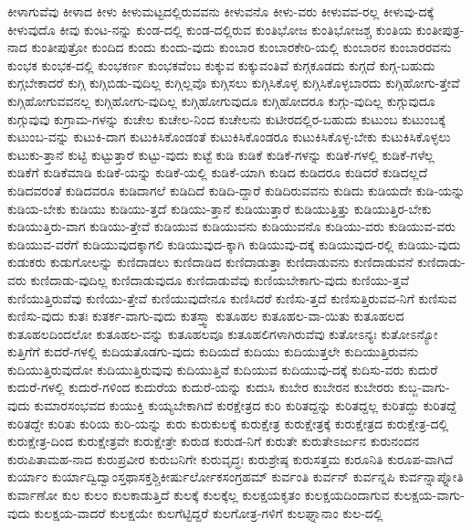 {ಕೀಳಾಗುವೆವು
ಕೀಳಾದ
ಕೀಳು
ಕೀಳುಮಟ್ಟದಲ್ಲಿರುವವನು
ಕೀಳುವನೊ
ಕೀಳು-ವರು
ಕೀಳುವವ-ರಲ್ಲ
ಕೀಳುವು-ದಕ್ಕೆ
ಕೀಳುವುದೊ
ಕೀವು
ಕುಂಟ-ನನ್ನು
ಕುಂಡ-ದಲ್ಲಿ
ಕುಂಡ-ದಲ್ಲಿರುವ
ಕುಂತಿಭೋಜ
ಕುಂತಿಭೋಜಶ್ಚ
ಕುಂತಿಯ
ಕುಂತೀಪುತ್ರ-ನಾದ
ಕುಂತೀಪುತ್ರೋ
ಕುಂದಿದ
ಕುಂದು
ಕುಂದು-ವುದು
ಕುಂಬಾರ
ಕುಂಬಾರಕೇರಿ-ಯಲ್ಲಿ
ಕುಂಬಾರನ
ಕುಂಬಾರರವನು
ಕುಂಭಕ
ಕುಂಭಕ-ದಲ್ಲಿ
ಕುಂಭಕರ್ಣ
ಕುಂಭಕವೆಂಬ
ಕುಕ್ಕುವ
ಕುಕ್ಕುವಂತಿವೆ
ಕುಗ್ಗಕೂಡದು
ಕುಗ್ಗದೆ
ಕುಗ್ಗ-ಬಹುದು
ಕುಗ್ಗಬೇಕಾದರೆ
ಕುಗ್ಗಿ
ಕುಗ್ಗಿಬಿಡು-ವುದಿಲ್ಲ
ಕುಗ್ಗಿಲ್ಲವೊ
ಕುಗ್ಗಿಸಲು
ಕುಗ್ಗಿಸಿಕೊಳ್ಳ
ಕುಗ್ಗಿಸಿಕೊಳ್ಳಬಾರದು
ಕುಗ್ಗಿಹೋಗು-ತ್ತೇವೆ
ಕುಗ್ಗಿಹೋಗುವವನಲ್ಲ
ಕುಗ್ಗಿಹೋಗು-ವುದಿಲ್ಲ
ಕುಗ್ಗಿಹೋಗುವುದೂ
ಕುಗ್ಗಿಹೋದರೂ
ಕುಗ್ಗು-ವುದಿಲ್ಲ
ಕುಗ್ಗುವುದೂ
ಕುಗ್ಗುವುವು
ಕುಗ್ರಾಮ-ಗಳನ್ನು
ಕುಚೇಲ
ಕುಚೇಲ-ನಿಂದ
ಕುಚೇಲನು
ಕುಟೀರದಲ್ಲಿರ-ಬಹುದು
ಕುಟುಂಬ
ಕುಟುಂಬಕ್ಕೆ
ಕುಟುಂಬ-ವನ್ನು
ಕುಟುಕಿ-ದಾಗ
ಕುಟುಕಿಸಿಕೊಂಡಂತೆ
ಕುಟುಕಿಸಿಕೊಂಡರೂ
ಕುಟುಕಿಸಿಕೊಳ್ಳ-ಬೇಕು
ಕುಟುಕಿಸಿಕೊಳ್ಳಲು
ಕುಟುಕು-ತ್ತಾನೆ
ಕುಟ್ಟಿ
ಕುಟ್ಟುತ್ತಾರೆ
ಕುಟ್ಟು-ವುದು
ಕುಟ್ಟೆ
ಕುಡಿ
ಕುಡಿಕೆ
ಕುಡಿಕೆ-ಗಳನ್ನು
ಕುಡಿಕೆ-ಗಳಲ್ಲಿ
ಕುಡಿಕೆ-ಗಳೆಲ್ಲ
ಕುಡಿಕೆಗೆ
ಕುಡಿಕೆಮಾಡಿ
ಕುಡಿಕೆ-ಯನ್ನು
ಕುಡಿಕೆ-ಯಲ್ಲಿ
ಕುಡಿಕೆ-ಯಾಗಿ
ಕುಡಿದ
ಕುಡಿದರೂ
ಕುಡಿದರೆ
ಕುಡಿದಲ್ಲದೆ
ಕುಡಿದವರಂತೆ
ಕುಡಿದವರೂ
ಕುಡಿದಾಗಲೆ
ಕುಡಿದಿದೆ
ಕುಡಿದಿ-ದ್ದಾರೆ
ಕುಡಿದಿರುವವನು
ಕುಡಿದು
ಕುಡಿಯದೇ
ಕುಡಿ-ಯನ್ನು
ಕುಡಿಯ-ಬೇಕು
ಕುಡಿಯು
ಕುಡಿಯು-ತ್ತದೆ
ಕುಡಿಯು-ತ್ತಾನೆ
ಕುಡಿಯುತ್ತಾರೆ
ಕುಡಿಯುತ್ತಿತ್ತು
ಕುಡಿಯುತ್ತಿರ-ಬೇಕು
ಕುಡಿಯುತ್ತಿರು-ವಾಗ
ಕುಡಿಯು-ತ್ತೇವೆ
ಕುಡಿಯುವ
ಕುಡಿಯುವನು
ಕುಡಿಯುವನೊ
ಕುಡಿಯು-ವರು
ಕುಡಿಯುವ-ವರು
ಕುಡಿಯುವ-ವರೆಗೆ
ಕುಡಿಯುವುದಕ್ಕಾಗಲಿ
ಕುಡಿಯುವುದ-ಕ್ಕಾಗಿ
ಕುಡಿಯುವು-ದಕ್ಕೆ
ಕುಡಿಯುವುದ-ರಲ್ಲಿ
ಕುಡಿಯು-ವುದು
ಕುಡುಕರು
ಕುಡುಗೋಲನ್ನು
ಕುಣಿದಾಡಲು
ಕುಣಿದಾಡಿದ
ಕುಣಿದಾಡುತ್ತಾ
ಕುಣಿದಾಡುವನು
ಕುಣಿದಾಡುವನೆ
ಕುಣಿದಾಡು-ವರು
ಕುಣಿದಾಡು-ವುದಿಲ್ಲ
ಕುಣಿದಾಡುವುದೂ
ಕುಣಿದಾಡುವೆವು
ಕುಣಿಯಬೇಕಾಗು-ವುದು
ಕುಣಿಯು-ತ್ತವೆ
ಕುಣಿಯುತ್ತಿರುವೆವು
ಕುಣಿಯು-ತ್ತೇವೆ
ಕುಣಿಯುವುದೇನೂ
ಕುಣಿಸಿದರೆ
ಕುಣಿಸು-ತ್ತದೆ
ಕುಣಿಸುತ್ತಿರುವವ-ನಿಗೆ
ಕುಣಿಸುವ
ಕುಣಿಸು-ವುದು
ಕುತಃ
ಕುತರ್ಕ-ವಾಗು-ವುದು
ಕುತಸ್ತ್ವಾ
ಕುತೂಹಲ
ಕುತೂಹಲ-ವಾ-ಯಿತು
ಕುತೂಹಲದ
ಕುತೂಹಲದಿಂದಲೋ
ಕುತೂಹಲ-ವನ್ನು
ಕುತೂಹಲವೂ
ಕುತೂಹಲಿಗಳಾಗಿರುವೆವು
ಕುತೋಽನ್ಯಃ
ಕುತೋಽನ್ಯೋ
ಕುತ್ತಿಗೆಗೆ
ಕುದರೆ-ಗಳಲ್ಲಿ
ಕುದಿಯತೊಡಗು-ವುದು
ಕುದಿಯದೆ
ಕುದಿಯು
ಕುದಿಯುತ್ತಲೇ
ಕುದಿಯುತ್ತಿರುವನು
ಕುದಿಯುತ್ತಿರುವುದೋ
ಕುದಿಯುತ್ತಿರುವುವು
ಕುದಿಯುತ್ತಿವೆ
ಕುದಿಯುವ
ಕುದಿಯುವು-ದಕ್ಕೆ
ಕುದಿಸು-ವರು
ಕುದುರೆ
ಕುದುರೆ-ಗಳಲ್ಲಿ
ಕುದುರೆ-ಗಳಿಂದ
ಕುದುರೆಯ
ಕುದುರೆ-ಯನ್ನು
ಕುದುಸಿ
ಕುಬೇರ
ಕುಬೇರನ
ಕುಬೇರರು
ಕುಬ್ಜ-ವಾಗು-ವುದು
ಕುಮಾರಸಂಭವದ
ಕುಯುಕ್ತಿ
ಕುಯ್ಯಬೇಕಾಗಿದೆ
ಕುರಕ್ಷೇತ್ರದ
ಕುರಿ
ಕುರಿತದ್ದನ್ನು
ಕುರಿತದ್ದಲ್ಲ
ಕುರಿತದ್ದು
ಕುರಿತದ್ದೆ
ಕುರಿತದ್ದೇ
ಕುರಿತು
ಕುರಿಯ
ಕುರಿ-ಯನ್ನು
ಕುರು
ಕುರುಕುಲಕ್ಕೆ
ಕುರುಕ್ಷೇತ್ರ
ಕುರುಕ್ಷೇತ್ರಕ್ಕೆ
ಕುರುಕ್ಷೇತ್ರದ
ಕುರುಕ್ಷೇತ್ರ-ದಲ್ಲಿ
ಕುರುಕ್ಷೇತ್ರ-ದಿಂದ
ಕುರುಕ್ಷೇತ್ರವೇ
ಕುರುಕ್ಷೇತ್ರೇ
ಕುರುಡ
ಕುರುಡ-ನಿಗೆ
ಕುರುತೇ
ಕುರುತೇಽರ್ಜುನ
ಕುರುನಂದನ
ಕುರುಪಿತಾಮಹ-ನಾದ
ಕುರುಪ್ರವೀರ
ಕುರುಬನಿಗೇ
ಕುರುವೃದ್ಧಃ
ಕುರುಶ್ರೇಷ್ಠ
ಕುರುಸತ್ತಮ
ಕುರೂನಿತಿ
ಕುರೂಪ-ವಾಗಿದೆ
ಕುರ್ಯಾಂ
ಕುರ್ಯಾದ್ವಿದ್ವಾಂಸ್ತಥಾಸಕ್ತಶ್ಚಿಕೀರ್ಷುರ್ಲೋಕಸಂಗ್ರಹಮ್
ಕುರ್ವಂತಿ
ಕುರ್ವನ್
ಕುರ್ವನ್ನಪಿ
ಕುರ್ವನ್ನಾಪ್ನೋತಿ
ಕುರ್ವಾಣೋ
ಕುಲ
ಕುಲಂ
ಕುಲಕಾಡುತ್ತಿದೆ
ಕುಲಕ್ಕೆ
ಕುಲಕ್ಕೆಲ್ಲ
ಕುಲಕ್ಷಯಕೃತಂ
ಕುಲಕ್ಷಯದಿಂದಾಗುವ
ಕುಲಕ್ಷಯ-ವಾಗು-ವುದು
ಕುಲಕ್ಷಯ-ವಾದರೆ
ಕುಲಕ್ಷಯೇ
ಕುಲಗೆಟ್ಟಿದ್ದರೆ
ಕುಲಗೋತ್ರ-ಗಳಿಗೆ
ಕುಲಘ್ನಾನಾಂ
ಕುಲ-ದಲ್ಲಿ
}
